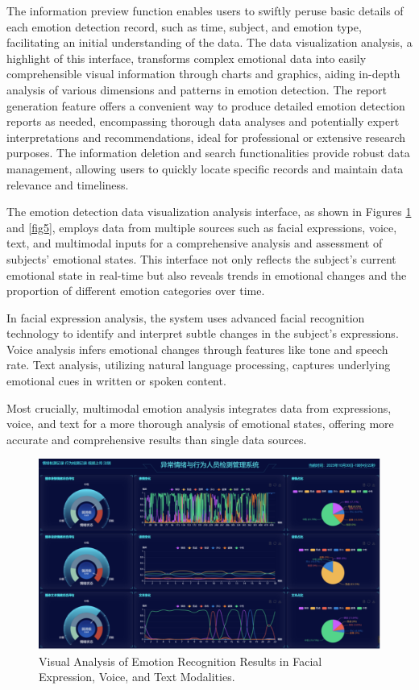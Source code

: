 \documentclass[preprint,12pt]{elsarticle}
\begin{document}
The information preview function enables users to swiftly peruse basic details of each emotion detection record, such as time, subject, and emotion type, facilitating an initial understanding of the data. The data visualization analysis, a highlight of this interface, transforms complex emotional data into easily comprehensible visual information through charts and graphics, aiding in-depth analysis of various dimensions and patterns in emotion detection. The report generation feature offers a convenient way to produce detailed emotion detection reports as needed, encompassing thorough data analyses and potentially expert interpretations and recommendations, ideal for professional or extensive research purposes. The information deletion and search functionalities provide robust data management, allowing users to quickly locate specific records and maintain data relevance and timeliness.

The emotion detection data visualization analysis interface, as shown in Figures \ref{fig4} and \ref{fig5}, employs data from multiple sources such as facial expressions, voice, text, and multimodal inputs for a comprehensive analysis and assessment of subjects' emotional states. This interface not only reflects the subject's current emotional state in real-time but also reveals trends in emotional changes and the proportion of different emotion categories over time.

In facial expression analysis, the system uses advanced facial recognition technology to identify and interpret subtle changes in the subject's expressions. Voice analysis infers emotional changes through features like tone and speech rate. Text analysis, utilizing natural language processing, captures underlying emotional cues in written or spoken content.

Most crucially, multimodal emotion analysis integrates data from expressions, voice, and text for a more thorough analysis of emotional states, offering more accurate and comprehensive results than single data sources.

\begin{figure}[h]%
\centering
\includegraphics[width=1\textwidth]{Fig4.png}
\caption{Visual Analysis of Emotion Recognition Results in Facial Expression, Voice, and Text Modalities.}\label{fig4}
\end{figure}
\end{document}
